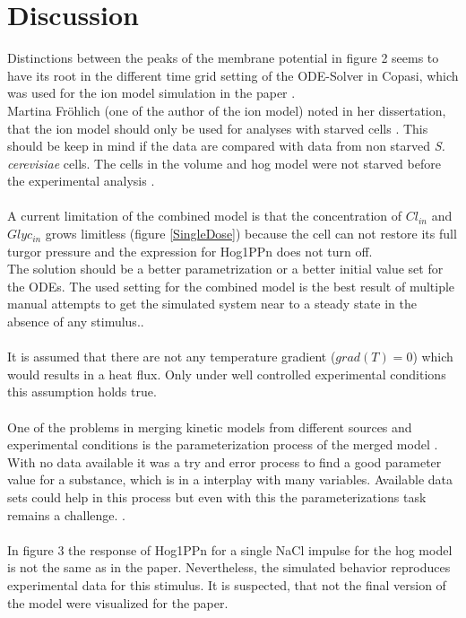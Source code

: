 \newpage 
\section{Discussion}
Distinctions between the peaks of the membrane potential in figure 2 seems to have its root in the different time grid setting of the ODE-Solver in Copasi, which was used for the ion model simulation in the paper \cite{Gerber_2016}.\\
Martina Fröhlich (one of the author of the ion model) noted in her dissertation, that the ion model should only be used for analyses with starved cells \cite{martinafroehlich}. This should be keep in mind if the data are compared with data from non starved \emph{S. cerevisiae} cells. The cells in the volume and hog model were not starved before the experimental analysis \cite{Zi_2010}\cite{volumeModel}.  \\\\
A current limitation of the combined model is that the concentration of $Cl_{in}$ and $Glyc_{in}$ grows limitless (figure \ref{SingleDose}) because the cell can not restore its full turgor pressure and the expression for Hog1PPn does not turn off.\\ The solution should be a better parametrization or a better initial value set for the ODEs. The used setting for the combined model is the best result of multiple manual attempts to get the simulated system near to a steady state in the absence of any stimulus..\\\\
It is assumed that there are not any temperature gradient ($grad(T)=0$) which would results in a heat flux. Only under well controlled experimental conditions this assumption holds true.\\\\
One of the problems in merging kinetic models from different sources and experimental conditions is the parameterization process of the merged model \cite{Wang2017}. With no data available it was a try and error process to find a good parameter value for a substance, which is in a interplay with many variables. Available data sets could help in this process but even with this the parameterizations task remains a challenge. \cite{Ke_2013}. \\\\
In figure 3 the response of Hog1PPn for a single NaCl impulse for the hog model is not the same as in the paper. Nevertheless, the simulated behavior reproduces experimental data for this stimulus. It is suspected, that not the final version of the model were visualized for the paper.\\\\
\newpage

